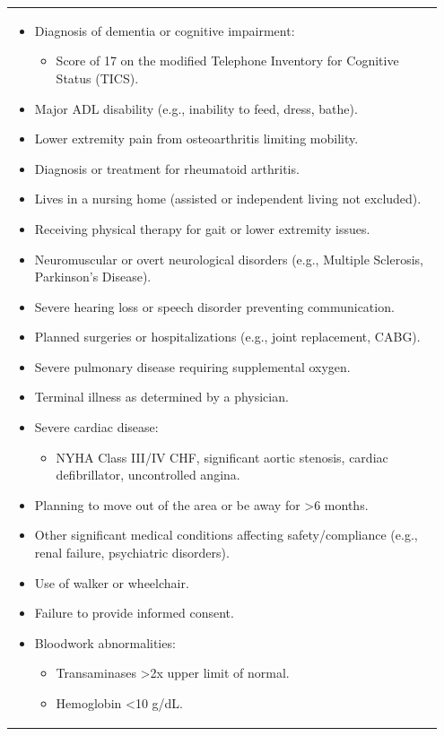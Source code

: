 \documentclass[a4paper,fleqn]{cas-sc}
\begin{document}
\begin{longtable}{|p{0.95\linewidth}|}
\begin{itemize}
    \item Diagnosis of dementia or cognitive impairment:
        \begin{itemize}
            \item Score of 17 on the modified Telephone Inventory for Cognitive Status (TICS).
        \end{itemize}
    \item Major ADL disability (e.g., inability to feed, dress, bathe).
    \item Lower extremity pain from osteoarthritis limiting mobility.
    \item Diagnosis or treatment for rheumatoid arthritis.
    \item Lives in a nursing home (assisted or independent living not excluded).
    \item Receiving physical therapy for gait or lower extremity issues.
    \item Neuromuscular or overt neurological disorders (e.g., Multiple Sclerosis, Parkinson’s Disease).
    \item Severe hearing loss or speech disorder preventing communication.
    \item Planned surgeries or hospitalizations (e.g., joint replacement, CABG).
    \item Severe pulmonary disease requiring supplemental oxygen.
    \item Terminal illness as determined by a physician.
    \item Severe cardiac disease:
        \begin{itemize}
            \item NYHA Class III/IV CHF, significant aortic stenosis, cardiac defibrillator, uncontrolled angina.
        \end{itemize}
    \item Planning to move out of the area or be away for >6 months.
    \item Other significant medical conditions affecting safety/compliance (e.g., renal failure, psychiatric disorders).
    \item Use of walker or wheelchair.
    \item Failure to provide informed consent.
    \item Bloodwork abnormalities:
        \begin{itemize}
            \item Transaminases >2x upper limit of normal.
            \item Hemoglobin <10 g/dL.

\end{itemize}
\end{itemize}
\end{longtable}
\end{document}
